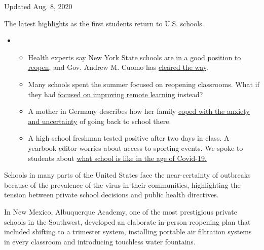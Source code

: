 Updated Aug. 8, 2020

The latest highlights as the first students return to U.S. schools.

\begin{itemize}
\item
  \begin{itemize}
  \tightlist
  \item
    Health experts say New York State schools are
    \href{https://www.nytimes.com/2020/08/07/health/coronavirus-ny-schools-reopen.html?action=click\&pgtype=Article\&state=default\&region=MAIN_CONTENT_2\&context=storylines_keepup}{in
    a good position to reopen}, and Gov. Andrew M. Cuomo has
    \href{https://www.nytimes.com/2020/08/07/nyregion/cuomo-schools-reopening.html?action=click\&pgtype=Article\&state=default\&region=MAIN_CONTENT_2\&context=storylines_keepup}{cleared
    the way}.
  \item
    Many schools spent the summer focused on reopening classrooms. What
    if they had
    \href{https://www.nytimes.com/2020/08/07/us/remote-learning-fall-2020.html?action=click\&pgtype=Article\&state=default\&region=MAIN_CONTENT_2\&context=storylines_keepup}{focused
    on improving remote learning} instead?
  \item
    A mother in Germany describes how her family
    \href{https://www.nytimes.com/2020/08/07/parenting/germany-schools-reopening-children.html?action=click\&pgtype=Article\&state=default\&region=MAIN_CONTENT_2\&context=storylines_keepup}{coped
    with the anxiety and uncertainty} of going back to school there.
  \item
    A high school freshman tested positive after two days in class. A
    yearbook editor worries about access to sporting events. We spoke to
    students about
    \href{https://www.nytimes.com/2020/08/06/us/coronavirus-students.html?action=click\&pgtype=Article\&state=default\&region=MAIN_CONTENT_2\&context=storylines_keepup}{what
    school is like in the age of Covid-19.}
  \end{itemize}
\end{itemize}

Schools in many parts of the United States face the near-certainty of
outbreaks because of the prevalence of the virus in their communities,
highlighting the tension between private school decisions and public
health directives.

In New Mexico, Albuquerque Academy, one of the most prestigious private
schools in the Southwest, developed an elaborate in-person reopening
plan that included shifting to a trimester system, installing portable
air filtration systems in every classroom and introducing touchless
water fountains.

